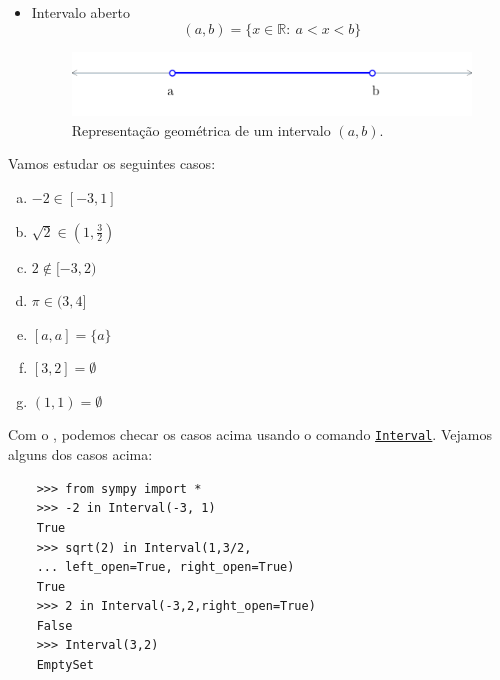 \begin{itemize}
\item Intervalo aberto
  \begin{equation}
    (a, b) = \{x\in\mathbb{R}:~a< x< b\}
  \end{equation}  

  \begin{figure}[H]
    \centering
    \includegraphics{./cap_numreal/dados/fig_int_aberto/main}
    \caption{Representação geométrica de um intervalo $(a,b)$.}
    \label{fig:intAberto}
  \end{figure}

\end{itemize}

\begin{ex}
  Vamos estudar os seguintes casos:
  \begin{enumerate}[a)]
  \item $-2\in [-3, 1]$
  \item $\displaystyle \sqrt{2}\in \left(1, \frac{3}{2}\right)$
  \item $2\not\in [-3, 2)$
  \item $\pi\in (3, 4]$
  \item $[a, a] = \{a\}$
  \item $[3, 2]=\emptyset$
  \item $(1, 1)=\emptyset$
  \end{enumerate}
  

  \ifispython
  Com o \sympy, podemos checar os casos acima usando o comando \href{https://docs.sympy.org/latest/modules/sets.html#sympy.sets.sets.Interval}{\lstinline{Interval}}. Vejamos alguns dos casos acima:
  \begin{lstlisting}
    >>> from sympy import *
    >>> -2 in Interval(-3, 1)
    True
    >>> sqrt(2) in Interval(1,3/2,
    ... left_open=True, right_open=True)
    True
    >>> 2 in Interval(-3,2,right_open=True)
    False
    >>> Interval(3,2)
    EmptySet
  \end{lstlisting}
  \fi
\end{ex}

